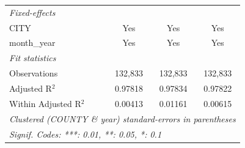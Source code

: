 \begin{tabular}{lccc}
   \midrule
   \emph{Fixed-effects}\\
   CITY                                   & Yes      & Yes                   & Yes\\  
   month\_year                            & Yes      & Yes                   & Yes\\  
   \midrule
   \emph{Fit statistics}\\
   Observations                           & 132,833  & 132,833               & 132,833\\  
   Adjusted R$^2$                         & 0.97818  & 0.97834               & 0.97822\\  
   Within Adjusted R$^2$                  & 0.00413  & 0.01161               & 0.00615\\  
   \midrule \midrule
   \multicolumn{4}{l}{\emph{Clustered (COUNTY \& year) standard-errors in parentheses}}\\
   \multicolumn{4}{l}{\emph{Signif. Codes: ***: 0.01, **: 0.05, *: 0.1}}\\
\end{tabular}
\par\endgroup



